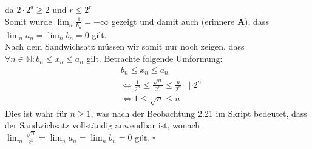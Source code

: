 \documentclass[12pt, a4paper]{article}
\newcommand*{\qed}{\null\nobreak\hfill\ensuremath{\square}}
\begin{document}
da $2 \cdot 2^d \ge 2$ und $r \le 2^r$ \\
Somit wurde $\lim_{n}\frac{1}{b_n} = +\infty$ gezeigt und damit auch (erinnere \textbf{A}), dass $\lim_{n}a_n = \lim_{n}b_n = 0$ gilt.\\
Nach dem Sandwichsatz müssen wir somit nur noch zeigen, dass \\
$\forall n \in \mathbb N: b_n \le x_n \le a_n$ gilt. Betrachte folgende Umformung:
\vspace{-0.5cm}
\begin{align*}
    & b_n \le x_n \le a_n & \\
    & \Longleftrightarrow \frac{1}{2^n} \le \frac{\sqrt{n}}{2^n} \le \frac{n}{2^n} &| \cdot 2^n \\
    & \Longleftrightarrow 1 \le \sqrt{n} \le n &
\end{align*}
Dies ist wahr für $n \ge 1$, was nach der Beobachtung 2.21 im Skript bedeutet, dass der Sandwichsatz vollständig anwendbar ist, wonach \\
$\lim_{n}\frac{\sqrt{n}}{2^n} = \lim_{n}a_n = \lim_{n}b_n = 0$ gilt. \qed \\
\end{document}
